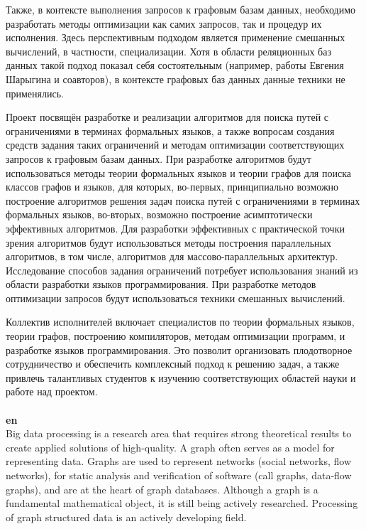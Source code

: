 \documentclass[12pt]{article}  %
\theoremstyle{remark}
\begin{document}
Также, в контексте выполнения запросов к графовым базам данных, необходимо разработать методы оптимизации как самих запросов, так и процедур их исполнения.
Здесь перспективным подходом является применение смешанных вычислений, в частности, специализации.
Хотя в области реляционных баз данных такой подход показал себя состоятельным (например, работы Евгения Шарыгина и соавторов), в контексте графовых баз данных данные техники не применялись.

Проект посвящён разработке и реализации алгоритмов для поиска путей с ограничениями в терминах формальных языков, а также вопросам создания средств задания таких ограничений и методам оптимизации соответствующих запросов к графовым базам данных.
При разработке алгоритмов будут использоваться методы теории формальных языков и теории графов для поиска классов графов и языков, для которых, во-первых, принципиально возможно построение алгоритмов решения задач поиска путей с ограничениями в терминах формальных языков, во-вторых,  возможно построение асимптотически эффективных алгоритмов.
Для разработки эффективных с практической точки зрения алгоритмов будут использоваться методы построения параллельных алгоритмов, в том числе, алгоритмов для массово-параллельных архитектур.
Исследование способов задания ограничений потребует использования знаний из области разработки языков программирования.
При разработке методов оптимизации запросов будут использоваться техники смешанных вычислений.

Коллектив исполнителей включает специалистов по теории формальных языков, теории графов, построению компиляторов, методам оптимизации программ, и разработке языков программирования.
Это позволит организовать плодотворное сотрудничество и обеспечить комплексный подход к решению задач, а также привлечь талантливых студентов к изучению соответствующих областей науки и работе над проектом.
\\
\\
\textbf{en}\\

Big data processing is a research area that requires strong theoretical results to create applied solutions of high-quality.
A graph often serves as a model for representing data.
Graphs are used to represent networks (social networks, flow networks), for static analysis and verification of software (call graphs, data-flow graphs), and are at the heart of graph databases.
Although a graph is a fundamental mathematical object, it is still being actively researched.
Processing of graph structured data is an actively developing field.
\end{document}
